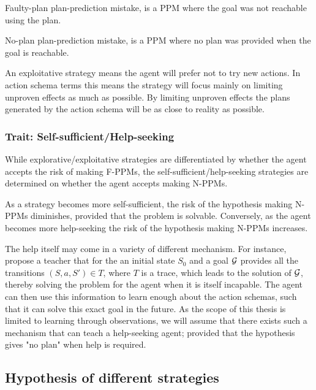\documentclass[\master/Master.tex]{subfiles}
\begin{document}
	\begin{definition} 
		[F-PPM] Faulty-plan plan-prediction mistake, is a PPM where the goal was not reachable using the plan.
	\end{definition}
	
	\begin{definition}
		[N-PPM] No-plan plan-prediction mistake, is a PPM where no plan was provided when the goal is reachable.
	\end{definition}
	An exploitative strategy means the agent will prefer not to try new actions.
	In action schema terms this means the strategy will focus mainly on limiting unproven effects as much as possible.
	By limiting unproven effects the plans generated by the action schema will be as close to reality as possible.

\subsubsection{Trait: Self-sufficient/Help-seeking}

	While explorative/exploitative strategies are differentiated by whether the agent accepts the risk of making F-PPMs, the self-sufficient/help-seeking strategies are determined on whether the agent accepts making N-PPMs.

	As a strategy becomes more self-sufficient, the risk of the hypothesis making N-PPMs diminishes, provided that the problem is solvable.
	Conversely, as the agent becomes more help-seeking the risk of the hypothesis making N-PPMs increases.

	The help itself may come in a variety  of different mechanism.
	For instance, \cite{Walsh2008} propose a teacher that for the an initial state $S_0$ and a goal $\mathcal{G}$ provides all the transitions $(S,a,S') \in T$, where $T$ is a trace, which leads to the solution of $\mathcal{G}$,
	 thereby solving the problem for the agent when it is itself incapable.
	The agent can then use this information to learn enough about the action schemas, such that it can solve this exact goal in the future.
	As the scope of this thesis is limited to learning through observations, we will assume that there exists such a mechanism that can teach a help-seeking agent;
	provided that the hypothesis gives "no plan" when help is required.

\subsection{Hypothesis of different strategies}
\end{document}

